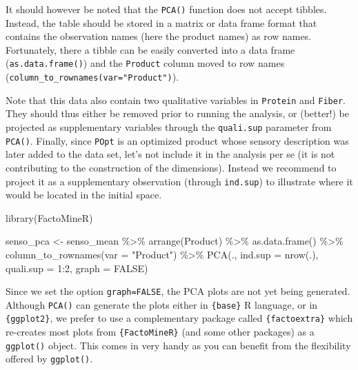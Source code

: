 \documentclass[
]{krantz}
\makeatletter
\newenvironment{Shaded}{\begin{snugshade}}{\end{snugshade}}
\newcommand{\AttributeTok}[1]{\textcolor[rgb]{0.61,0.61,0.61}{#1}}
\newcommand{\ConstantTok}[1]{\textcolor[rgb]{0,0,0}{#1}}
\newcommand{\DecValTok}[1]{\textcolor[rgb]{0.06,0.06,0.06}{#1}}
\newcommand{\FunctionTok}[1]{\textcolor[rgb]{0,0,0}{#1}}
\newcommand{\NormalTok}[1]{#1}
\newcommand{\OtherTok}[1]{\textcolor[rgb]{0.37,0.37,0.37}{#1}}
\newcommand{\SpecialCharTok}[1]{\textcolor[rgb]{0,0,0}{#1}}
\newcommand{\StringTok}[1]{\textcolor[rgb]{0.5,0.5,0.5}{#1}}
\newenvironment{kframe}{%
\medskip{}
\setlength{\fboxsep}{.8em}
 \def\at@end@of@kframe{}%
 \ifinner\ifhmode%
  \def\at@end@of@kframe{\end{minipage}}%
  \begin{minipage}{\columnwidth}%
 \fi\fi%
 \def\FrameCommand##1{\hskip\@totalleftmargin \hskip-\fboxsep
 \colorbox{shadecolor}{##1}\hskip-\fboxsep
     \hskip-\linewidth \hskip-\@totalleftmargin \hskip\columnwidth}%
 \MakeFramed {\advance\hsize-\width
   \@totalleftmargin\z@ \linewidth\hsize
   \@setminipage}}%
 {\par\unskip\endMakeFramed%
 \at@end@of@kframe}
\renewenvironment{Shaded}{\begin{kframe}}{\end{kframe}}
\makeatother
\begin{document}
It should however be noted that the \texttt{PCA()} function does not accept tibbles. Instead, the table should be stored in a matrix or data frame format that contains the observation names (here the product names) as row names. Fortunately, there a tibble can be easily converted into a data frame (\texttt{as.data.frame()}) and the \texttt{Product} column moved to row names (\texttt{column\_to\_rownames(var="Product")}).

Note that this data also contain two qualitative variables in \texttt{Protein} and \texttt{Fiber}. They should thus either be removed prior to running the analysis, or (better!) be projected as supplementary variables through the \texttt{quali.sup} parameter from \texttt{PCA()}. Finally, since \texttt{POpt} is an optimized product whose sensory description was later added to the data set, let's not include it in the analysis per se (it is not contributing to the construction of the dimensions). Instead we recommend to project it as a supplementary observation (through \texttt{ind.sup}) to illustrate where it would be located in the initial space.

\begin{Shaded}
\begin{Highlighting}[]
\FunctionTok{library}\NormalTok{(FactoMineR)}

\NormalTok{senso\_pca }\OtherTok{\textless{}{-}}\NormalTok{ senso\_mean }\SpecialCharTok{\%\textgreater{}\%}
  \FunctionTok{arrange}\NormalTok{(Product) }\SpecialCharTok{\%\textgreater{}\%}
  \FunctionTok{as.data.frame}\NormalTok{() }\SpecialCharTok{\%\textgreater{}\%}
  \FunctionTok{column\_to\_rownames}\NormalTok{(}\AttributeTok{var =} \StringTok{"Product"}\NormalTok{) }\SpecialCharTok{\%\textgreater{}\%}
  \FunctionTok{PCA}\NormalTok{(., }\AttributeTok{ind.sup =} \FunctionTok{nrow}\NormalTok{(.), }\AttributeTok{quali.sup =} \DecValTok{1}\SpecialCharTok{:}\DecValTok{2}\NormalTok{, }\AttributeTok{graph =} \ConstantTok{FALSE}\NormalTok{)}
\end{Highlighting}
\end{Shaded}

Since we set the option \texttt{graph=FALSE}, the PCA plots are not yet being generated. Although \texttt{PCA()} can generate the plots either in \texttt{\{base\}} R language, or in \texttt{\{ggplot2\}}, we prefer to use a complementary package called \texttt{\{factoextra\}} which re-creates most plots from \texttt{\{FactoMineR\}} (and some other packages) as a \texttt{ggplot()} object. This comes in very handy as you can benefit from the flexibility offered by \texttt{ggplot()}.
\end{document}
